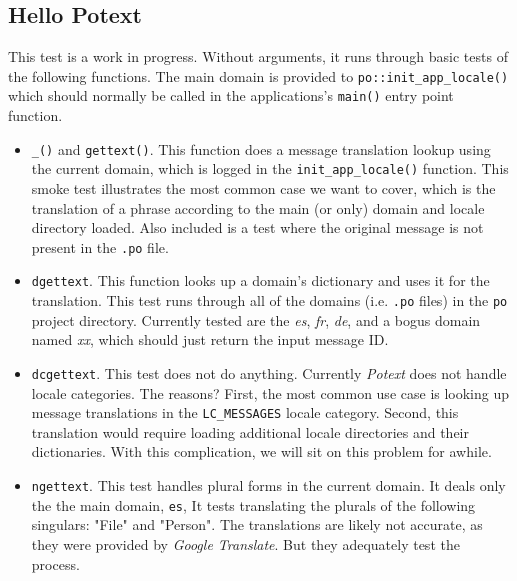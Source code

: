 \subsection{Hello Potext}
\label{subsec:potext_hello_potext}

   This test is a work in progress.
   Without arguments, it runs through basic tests of the following
   functions.
   The main domain is provided to \texttt{po::init\_app\_locale()}
   which should normally be called in the applications's
   \texttt{main()} entry point function.

   \begin{itemize}
      \item \texttt{\_()} and \texttt{gettext()}.
         This function does a message translation lookup using
         the current domain, which is logged in the
         \texttt{init\_app\_locale()} function.
         This smoke test illustrates the most common case we want to
         cover, which is the translation of a phrase according to
         the main (or only) domain and locale directory loaded.
         Also included is a test where the original message is not
         present in the \texttt{.po} file.
      \item \texttt{dgettext}.
         This function looks up a domain's dictionary and uses it
         for the translation.
         This test runs through all of the domains (i.e. \texttt{.po}
         files) in the \texttt{po} project directory.
         Currently tested are the \textsl{es}, \textsl{fr}, \textsl{de},
         and a bogus domain named \textsl{xx}, which should just return
         the input message ID.
      \item \texttt{dcgettext}.
         This test does not do anything.
         Currently \textsl{Potext} does not handle locale categories.
         The reasons? First, the most common use case is looking up
         message translations in the \texttt{LC\_MESSAGES} locale category.
         Second, this translation would require loading additional locale
         directories and their dictionaries.
         With this complication, we will sit on this problem for awhile.
      \item \texttt{ngettext}.
         This test handles plural forms in the current domain.
         It deals only the the main domain, \texttt{es},
         It tests translating the plurals of the following singulars:
         "File" and "Person". 
         The translations are likely not accurate, as they were provided
         by \textsl{Google Translate}.
         But they adequately test the process.

\end{itemize}
